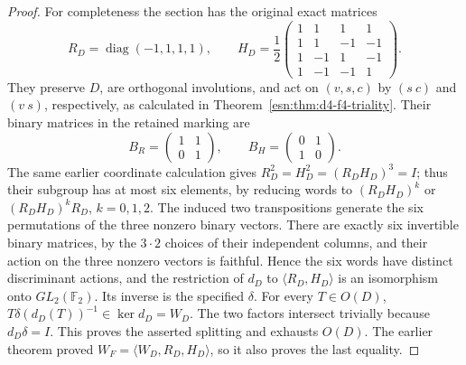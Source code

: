 \begin{proof}
For completeness the section has the original exact matrices
\[
 R_D=\operatorname{diag}(-1,1,1,1),\qquad
 H_D=\frac12
 \begin{pmatrix}
 1&1&1&1\\1&1&-1&-1\\1&-1&1&-1\\1&-1&-1&1
 \end{pmatrix}.
\]
They preserve \(D\), are orthogonal involutions, and act on
\((v,s,c)\) by \((s\ c)\) and \((v\ s)\), respectively,
as calculated in Theorem~\ref{esn:thm:d4-f4-triality}.
Their binary matrices in the retained marking are
\[
 B_R=\begin{pmatrix}1&1\\0&1\end{pmatrix},\qquad
 B_H=\begin{pmatrix}0&1\\1&0\end{pmatrix}.
\]
The same earlier coordinate calculation gives
\(R_D^2=H_D^2=(R_DH_D)^3=I\); thus their subgroup has at most six
elements, by reducing words to \((R_DH_D)^k\) or
\((R_DH_D)^kR_D\), \(k=0,1,2\).
The induced two transpositions generate the six permutations of the
three nonzero binary vectors.  There are exactly six invertible binary
matrices, by the \(3\cdot2\) choices of their independent columns,
and their action on the three nonzero vectors is faithful.  Hence the
six words have distinct discriminant actions, and the restriction of
\(d_D\) to \(\langle R_D,H_D\rangle\) is an isomorphism onto
\(GL_2(\mathbb F_2)\).  Its inverse is the specified \(\delta\).
For every \(T\in O(D)\),
\(T\delta(d_D(T))^{-1}\in\ker d_D=W_D\).
The two factors intersect trivially because \(d_D\delta=I\).
This proves the asserted splitting and exhausts \(O(D)\).
The earlier theorem proved
\(W_F=\langle W_D,R_D,H_D\rangle\), so it also proves the last equality.
\end{proof}

